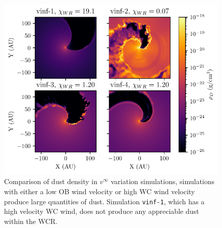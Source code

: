 \begin{figure}
  \centering
  \includegraphics{assets/results/vinf/vinf-finished-rhod.pdf}
  \caption[Dust density comparison of terminal velocity varying systems]{Comparison of dust density in $v^\infty$ variation simulations, simulations with either a low OB wind velocity or high WC wind velocity produce large quantities of dust. Simulation \texttt{vinf-1}, which has a high velocity WC wind, does not produce any appreciable dust within the WCR.}
  \label{fig:vinfrhodcomp}
\end{figure}

